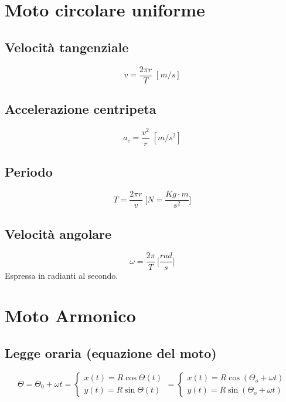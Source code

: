    \section*{Moto circolare uniforme}

        \subsection*{Velocità tangenziale} 
            \begin{equation*}
                v = \frac{2\pi r}{T} \; [m/s]
            \end{equation*}

        \subsection*{Accelerazione centripeta}
            \begin{equation*}
                a_c = \frac{v^2}{r} \; [m/s^2]
            \end{equation*}

        \subsection*{Periodo}
            \begin{equation*}
                T = \frac{2\pi r}{v} \; \Bigg[N = \frac{Kg \cdot m}{s^2} \Bigg]
            \end{equation*}
        
        \subsection*{Velocità angolare}
            \begin{equation*}
                \omega = \frac{2\pi}{T} \, \Bigg[\frac{rad}{s} \Bigg]
            \end{equation*}
        Espressa in radianti al secondo.
    
    \section*{Moto Armonico}

        \subsection*{Legge oraria (equazione del moto)} 
        \begin{equation*}
            \Theta = \Theta_0 + \omega t = 
            \begin{cases}
                x(t)=R\cos{\Theta(t)} \\
                y(t)=R\sin{\Theta(t)}
            \end{cases} 
            = 
            \begin{cases}
                x(t)=R\cos{(\Theta_o+\omega t)} \\
                y(t)=R\sin{(\Theta_o+\omega t)}
            \end{cases}
        \end{equation*}

